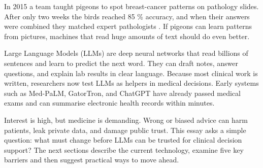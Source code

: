 \documentclass[12pt,a4paper]{scrreprt}
\begin{document}
\newpage
\cleardoublepage
{}
\setcounter{page}{1}
In 2015 a team taught pigeons to spot breast-cancer patterns on pathology slides. After only two weeks the birds reached 85 \% accuracy, and when their answers were combined they matched expert pathologists \autocite{Pigeon}. If pigeons can learn patterns from pictures, machines that read huge amounts of text should do even better.\par
\vspace{\baselineskip}
\noindent
Large Language Models (LLMs) are deep neural networks that read billions of sentences and learn to predict the next word. They can draft notes, answer questions, and explain lab results in clear language. Because most clinical work is written, researchers now test LLMs as helpers in medical decisions. Early systems such as Med-PaLM, GatorTron, and ChatGPT have already passed medical exams and can summarise electronic health records within minutes.\par
\vspace{\baselineskip}
\noindent
Interest is high, but medicine is demanding. Wrong or biased advice can harm patients, leak private data, and damage public trust. This essay asks a simple question: what must change before LLMs can be trusted for clinical decision support? The next sections describe the current technology, examine five key barriers and then suggest practical ways to move ahead.
\end{document}
